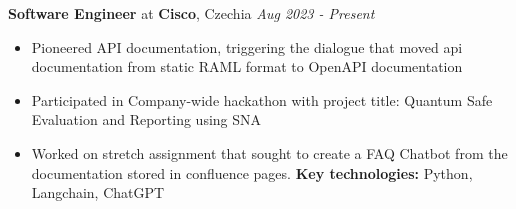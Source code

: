 
{\textbf{Software Engineer} at \textbf{Cisco}, Czechia}
    \hfill {\em Aug 2023 - Present}
    \begin{itemize}
        \item Pioneered API documentation, triggering the dialogue that moved api documentation from static RAML format to OpenAPI documentation
        \item Participated in Company-wide hackathon with project title: Quantum Safe Evaluation and Reporting using SNA  
        \item Worked on stretch assignment that sought to create a FAQ Chatbot from the documentation stored in confluence pages. \textbf{Key technologies:} Python, Langchain, ChatGPT
    \end{itemize}

